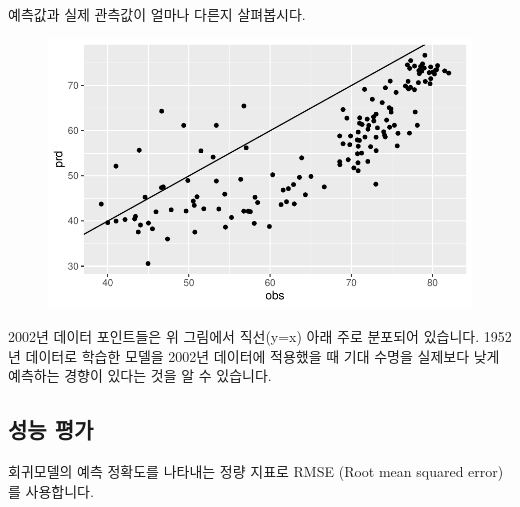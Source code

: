 \documentclass[
  letterpaper,
  DIV=11,
  numbers=noendperiod]{scrartcl}
\newenvironment{Shaded}{\begin{snugshade}}{\end{snugshade}}
\newcommand{\AttributeTok}[1]{\textcolor[rgb]{0.40,0.45,0.13}{#1}}
\newcommand{\DecValTok}[1]{\textcolor[rgb]{0.68,0.00,0.00}{#1}}
\newcommand{\FunctionTok}[1]{\textcolor[rgb]{0.28,0.35,0.67}{#1}}
\newcommand{\NormalTok}[1]{\textcolor[rgb]{0.00,0.23,0.31}{#1}}
\newcommand{\OtherTok}[1]{\textcolor[rgb]{0.00,0.23,0.31}{#1}}
\newcommand{\SpecialCharTok}[1]{\textcolor[rgb]{0.37,0.37,0.37}{#1}}
\begin{document}
예측값과 실제 관측값이 얼마나 다른지 살펴봅시다.

\begin{Shaded}
\end{Shaded}

\begin{figure}[H]

{\centering \includegraphics{LinearRegression_files/figure-pdf/unnamed-chunk-12-1.pdf}

}

\end{figure}

2002년 데이터 포인트들은 위 그림에서 직선(y=x) 아래 주로 분포되어
있습니다. 1952년 데이터로 학습한 모델을 2002년 데이터에 적용했을 때 기대
수명을 실제보다 낮게 예측하는 경향이 있다는 것을 알 수 있습니다.

\hypertarget{uxc131uxb2a5-uxd3c9uxac00}{%
\subsection{성능 평가}\label{uxc131uxb2a5-uxd3c9uxac00}}

회귀모델의 예측 정확도를 나타내는 정량 지표로 RMSE (Root mean squared
error)를 사용합니다.
\end{document}
